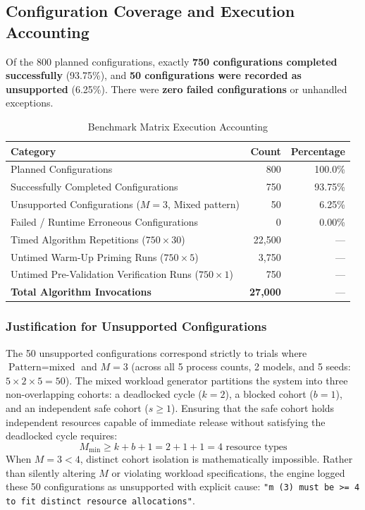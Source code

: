 \documentclass[11pt,a4paper]{article}
\begin{document}
\subsection{Configuration Coverage and Execution Accounting}
Of the 800 planned configurations, exactly \textbf{750 configurations completed successfully} (93.75\%), and \textbf{50 configurations were recorded as unsupported} (6.25\%). There were \textbf{zero failed configurations} or unhandled exceptions.

\begin{table}[H]
\centering
\caption{Benchmark Matrix Execution Accounting}
\label{tab:exec_accounting}
\begin{tabular}{lrr}
\toprule
\textbf{Category} & \textbf{Count} & \textbf{Percentage} \\
\midrule
Planned Configurations & 800 & 100.0\% \\
Successfully Completed Configurations & 750 & 93.75\% \\
Unsupported Configurations ($M=3$, Mixed pattern) & 50 & 6.25\% \\
Failed / Runtime Erroneous Configurations & 0 & 0.00\% \\
\midrule
Timed Algorithm Repetitions ($750 \times 30$) & 22,500 & --- \\
Untimed Warm-Up Priming Runs ($750 \times 5$) & 3,750 & --- \\
Untimed Pre-Validation Verification Runs ($750 \times 1$) & 750 & --- \\
\textbf{Total Algorithm Invocations} & \textbf{27,000} & --- \\
\bottomrule
\end{tabular}
\end{table}

\subsubsection{Justification for Unsupported Configurations}
The 50 unsupported configurations correspond strictly to trials where $\text{Pattern} = \text{mixed}$ and $M = 3$ (across all 5 process counts, 2 models, and 5 seeds: $5 \times 2 \times 5 = 50$). The mixed workload generator partitions the system into three non-overlapping cohorts: a deadlocked cycle ($k = 2$), a blocked cohort ($b = 1$), and an independent safe cohort ($s \ge 1$). Ensuring that the safe cohort holds independent resources capable of immediate release without satisfying the deadlocked cycle requires:
\begin{equation}
    M_{\text{min}} \ge k + b + 1 = 2 + 1 + 1 = 4\text{ resource types}
\end{equation}
When $M = 3 < 4$, distinct cohort isolation is mathematically impossible. Rather than silently altering $M$ or violating workload specifications, the engine logged these 50 configurations as unsupported with explicit cause: \texttt{"m (3) must be >= 4 to fit distinct resource allocations"}.
\end{document}
